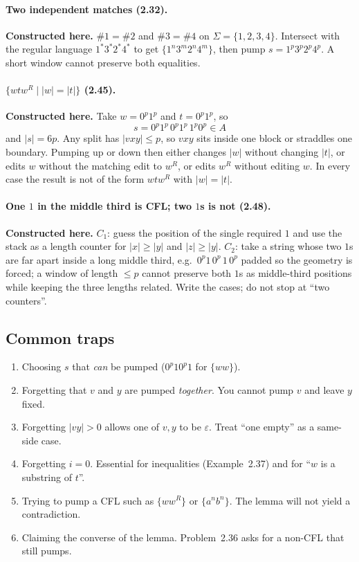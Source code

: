 \documentclass[11pt,a4paper]{article}
\newcommand{\eps}{\varepsilon}
\begin{document}
\paragraph{Two independent matches (2.32).}
\textbf{Constructed here.} $\#1=\#2$ and $\#3=\#4$ on
$\Sigma=\{1,2,3,4\}$. Intersect with the regular language
$1^*3^*2^*4^*$ to get $\{1^n3^m2^n4^m\}$, then pump
$s=1^p3^p2^p4^p$. A short window cannot preserve both equalities.

\paragraph{$\{wtw^R\mid |w|=|t|\}$ (2.45).}
\textbf{Constructed here.} Take $w=0^p1^p$ and $t=0^p1^p$, so
\[
  s=0^p1^p\,0^p1^p\,1^p0^p\in A
\]
and $|s|=6p$. Any split has $|vxy|\le p$, so $vxy$ sits inside one
block or straddles one boundary. Pumping up or down then either
changes $|w|$ without changing $|t|$, or edits $w$ without the
matching edit to $w^R$, or edits $w^R$ without editing $w$. In
every case the result is not of the form $wtw^R$ with
$|w|=|t|$.

\paragraph{One $1$ in the middle third is CFL; two $1$s is not
(2.48).}
\textbf{Constructed here.} $C_1$: guess the position of the single
required $1$ and use the stack as a length counter for
$|x|\ge|y|$ and $|z|\ge|y|$. $C_2$: take a string whose two $1$s
are far apart inside a long middle third, e.g.\
$0^p1\,0^p\,1\,0^p$ padded so the geometry is forced; a window of
length $\le p$ cannot preserve both $1$s as middle-third
positions while keeping the three lengths related. Write the
cases; do not stop at ``two counters''.

\subsection{Common traps}

\begin{enumerate}
  \item Choosing $s$ that \emph{can} be pumped ($0^p10^p1$ for
        $\{ww\}$).
  \item Forgetting that $v$ and $y$ are pumped \emph{together}.
        You cannot pump $v$ and leave $y$ fixed.
  \item Forgetting $|vy|>0$ allows one of $v,y$ to be $\eps$.
        Treat ``one empty'' as a same-side case.
  \item Forgetting $i=0$. Essential for inequalities
        (Example~2.37) and for ``$w$ is a substring of $t$''.
  \item Trying to pump a CFL such as $\{ww^R\}$ or $\{a^nb^n\}$.
        The lemma will not yield a contradiction.
  \item Claiming the converse of the lemma. Problem~2.36 asks for
        a non-CFL that still pumps.
\end{enumerate}
\end{document}
